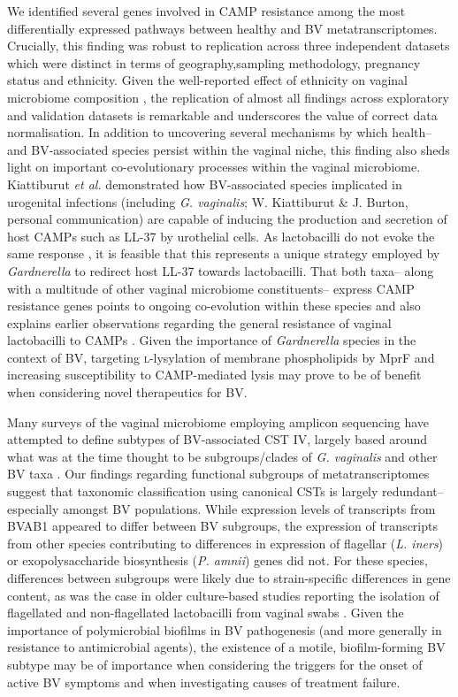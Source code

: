 \documentclass[sn-mathphys,Numbered]{sn-jnl}%
\begin{document}
We identified several genes involved in CAMP resistance among the most differentially expressed pathways between healthy and BV metatranscriptomes. Crucially, this finding was robust to replication across three independent datasets which were distinct in terms of geography,sampling methodology, pregnancy status and ethnicity. Given the well-reported effect of ethnicity on vaginal microbiome composition \citep{Ravel:2010, fettweis_ethnicity_2014}, the replication of almost all findings across exploratory and validation datasets is remarkable and underscores the value of correct data normalisation. In addition to uncovering several mechanisms by which health-- and BV-associated species persist within the vaginal niche, this finding also sheds light on important co-evolutionary processes within the vaginal microbiome. Kiattiburut \textit{et al.} \citep{Kiattiburut:2021} demonstrated how BV-associated species implicated in urogenital infections (including \textit{G. vaginalis}; W. Kiattiburut \& J. Burton, personal communication) are capable of inducing the production and secretion of host CAMPs such as LL-37 by urothelial cells. As lactobacilli do not evoke the same response \citep{Kiattiburut:2021}, it is feasible that this represents a unique strategy employed by \textit{Gardnerella} to redirect host LL-37 towards lactobacilli. That both taxa-- along with a multitude of other vaginal microbiome constituents-- express CAMP resistance genes points to ongoing co-evolution within these species and also explains earlier observations regarding the general resistance of vaginal lactobacilli to CAMPs \citep{smeianov_camps_2000}. Given the importance of \textit{Gardnerella} species in the context of BV, targeting \textsc{l}-lysylation of membrane phospholipids by MprF and increasing susceptibility to CAMP-mediated lysis may prove to be of benefit when considering novel therapeutics for BV.

Many surveys of the vaginal microbiome employing amplicon sequencing have attempted to define subtypes of BV-associated CST IV, largely based around what was at the time thought to be subgroups/clades of \textit{G. vaginalis} and other BV taxa \citep{freitas_vaginal_2017,romero_composition_2014}. Our findings regarding functional subgroups of metatranscriptomes suggest that taxonomic classification using canonical CSTs is largely redundant-- especially amongst BV populations. While expression levels of transcripts from BVAB1 appeared to differ between BV subgroups, the expression of transcripts from other species contributing to differences in expression of flagellar (\textit{L. iners}) or exopolysaccharide biosynthesis (\textit{P. amnii}) genes did not. For these species, differences between subgroups were likely due to strain-specific differences in gene content, as was the case in older culture-based studies reporting the isolation of flagellated and non-flagellated lactobacilli from vaginal swabs \citep{mcgroarty_cell_1994}. Given the importance of polymicrobial biofilms in BV pathogenesis (and more generally in resistance to antimicrobial agents), the existence of a motile, biofilm-forming BV subtype may be of importance when considering the triggers for the onset of active BV symptoms and when investigating causes of treatment failure.
\end{document}
